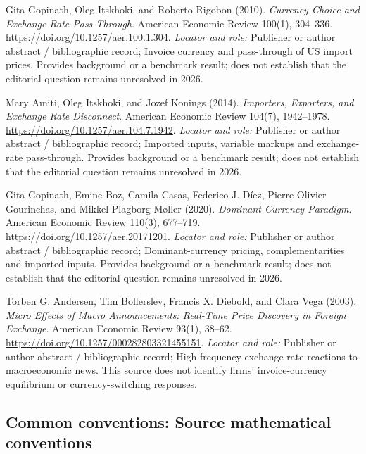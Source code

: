 \documentclass[11pt,a4paper]{article}
\begin{document}
\begin{enumerate}[label={[S\arabic*]},leftmargin=*]

\item Gita Gopinath, Oleg Itskhoki, and Roberto Rigobon (2010). \emph{Currency Choice and Exchange Rate Pass-Through}. American Economic Review 100(1), 304–336. \url{https://doi.org/10.1257/aer.100.1.304}.
\textit{Locator and role:} Publisher or author abstract / bibliographic record; Invoice currency and pass-through of US import prices. Provides background or a benchmark result; does not establish that the editorial question remains unresolved in 2026.

\item Mary Amiti, Oleg Itskhoki, and Jozef Konings (2014). \emph{Importers, Exporters, and Exchange Rate Disconnect}. American Economic Review 104(7), 1942–1978. \url{https://doi.org/10.1257/aer.104.7.1942}.
\textit{Locator and role:} Publisher or author abstract / bibliographic record; Imported inputs, variable markups and exchange-rate pass-through. Provides background or a benchmark result; does not establish that the editorial question remains unresolved in 2026.

\item Gita Gopinath, Emine Boz, Camila Casas, Federico J. Díez, Pierre-Olivier Gourinchas, and Mikkel Plagborg-Møller (2020). \emph{Dominant Currency Paradigm}. American Economic Review 110(3), 677–719. \url{https://doi.org/10.1257/aer.20171201}.
\textit{Locator and role:} Publisher or author abstract / bibliographic record; Dominant-currency pricing, complementarities and imported inputs. Provides background or a benchmark result; does not establish that the editorial question remains unresolved in 2026.

\item Torben G. Andersen, Tim Bollerslev, Francis X. Diebold, and Clara Vega (2003). \emph{Micro Effects of Macro Announcements: Real-Time Price Discovery in Foreign Exchange}. American Economic Review 93(1), 38–62. \url{https://doi.org/10.1257/000282803321455151}.
\textit{Locator and role:} Publisher or author abstract / bibliographic record; High-frequency exchange-rate reactions to macroeconomic news. This source does not identify firms’ invoice-currency equilibrium or currency-switching responses.

\end{enumerate}

\subsection*{Common conventions: Source mathematical conventions}
\end{document}
